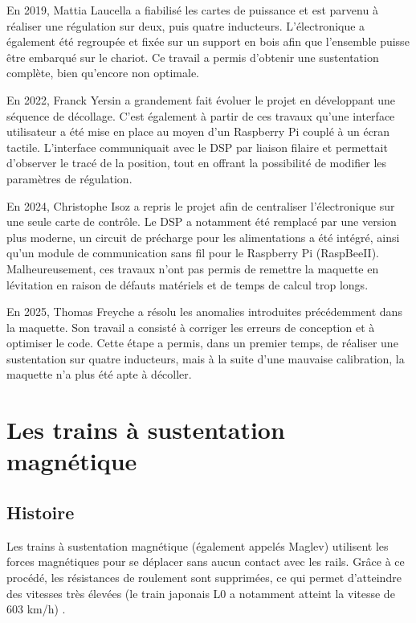 En 2019, Mattia Laucella \cite{Laucella} a fiabilisé les cartes de puissance et est parvenu à réaliser une régulation sur deux, puis quatre inducteurs. L'électronique a également été regroupée et fixée sur un support en bois afin que l'ensemble puisse être embarqué sur le chariot. Ce travail a permis d'obtenir une sustentation complète, bien qu'encore non optimale.

En 2022, Franck Yersin \cite{Yersin} a grandement fait évoluer le projet en développant une séquence de décollage. C'est également à partir de ces travaux qu'une interface utilisateur a été mise en place au moyen d'un Raspberry Pi couplé à un écran tactile. L'interface communiquait avec le DSP par liaison filaire et permettait d'observer le tracé de la position, tout en offrant la possibilité de modifier les paramètres de régulation.

En 2024, Christophe Isoz \cite{Isoz} a repris le projet afin de centraliser l'électronique sur une seule carte de contrôle. Le DSP a notamment été remplacé par une version plus moderne, un circuit de précharge pour les alimentations a été intégré, ainsi qu'un module de communication sans fil pour le Raspberry Pi (RaspBeeII). Malheureusement, ces travaux n'ont pas permis de remettre la maquette en lévitation en raison de défauts matériels et de temps de calcul trop longs.

En 2025, Thomas Freyche \cite{Freyche} a résolu les anomalies introduites précédemment dans la maquette. Son travail a consisté à corriger les erreurs de conception et à optimiser le code. Cette étape a permis, dans un premier temps, de réaliser une sustentation sur quatre inducteurs, mais à la suite d'une mauvaise calibration, la maquette n'a plus été apte à décoller.

\section{Les trains à sustentation magnétique}

\subsection{Histoire}

Les trains à sustentation magnétique (également appelés Maglev) utilisent les forces magnétiques pour se déplacer sans aucun contact avec les rails. Grâce à ce procédé, les résistances de roulement sont supprimées, ce qui permet d'atteindre des vitesses très élevées (le train japonais L0 a notamment atteint la vitesse de 603 km/h) \cite{Maglev}.

